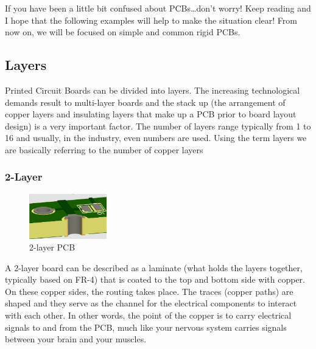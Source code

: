 \documentclass[final]{cubedoc}
\begin{document}
	If you have been a little bit confused about PCBs…don’t worry! Keep reading and I hope that the following examples will help to make  the situation clear! From now on, we will be focused on simple and common rigid PCBs.
	
	\subsection{Layers}
	
	Printed Circuit Boards can be divided into layers. The increasing technological demands result to multi-layer boards and the stack up (the arrangement of copper layers and insulating layers that make up a PCB prior to board layout design)  is a very important factor. The number of layers range typically from 1 to 16 %
	and usually, in the industry, even numbers are used. Using the term layers we are basically referring to the number of copper layers
	
	\subsubsection{2-Layer}
	
	\begin{figure}
		\centering
		\includegraphics[height=.15\textheight, width=0.3\textwidth]{assets/2_layer_euro_3D.png}
		\caption{2-layer PCB}
	\end{figure}
	
	A 2-layer board can be described as a laminate (what holds the layers together, typically based on FR-4) that is coated to the top and bottom side with copper. On these copper sides, the routing takes place. The traces (copper paths) are shaped and they serve as the channel for the electrical components to interact with each other. In other words, the point of the copper is to carry electrical signals to and from the PCB, much like your nervous system carries signals between your brain and your muscles. 
	
\end{document}
